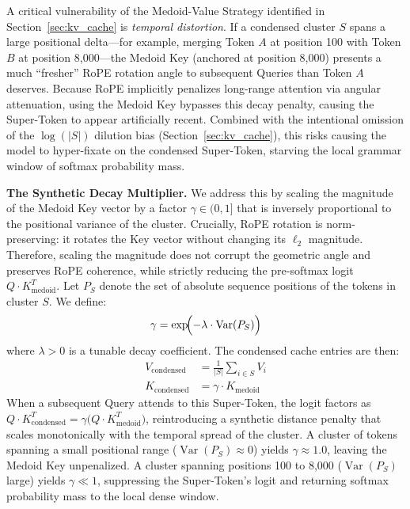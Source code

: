 \documentclass[11pt,a4paper]{article}
\begin{document}
A critical vulnerability of the Medoid-Value Strategy identified in Section~\ref{sec:kv_cache} is \emph{temporal distortion}. If a condensed cluster $S$ spans a large positional delta---for example, merging Token $A$ at position 100 with Token $B$ at position 8{,}000---the Medoid Key (anchored at position 8{,}000) presents a much ``fresher'' RoPE rotation angle to subsequent Queries than Token $A$ deserves. Because RoPE implicitly penalizes long-range attention via angular attenuation, using the Medoid Key bypasses this decay penalty, causing the Super-Token to appear artificially recent. Combined with the intentional omission of the $\log(|S|)$ dilution bias (Section~\ref{sec:kv_cache}), this risks causing the model to hyper-fixate on the condensed Super-Token, starving the local grammar window of softmax probability mass.

\textbf{The Synthetic Decay Multiplier.} We address this by scaling the magnitude of the Medoid Key vector by a factor $\gamma \in (0, 1]$ that is inversely proportional to the positional variance of the cluster. Crucially, RoPE rotation is norm-preserving: it rotates the Key vector without changing its $\ell_2$ magnitude. Therefore, scaling the magnitude does not corrupt the geometric angle and preserves RoPE coherence, while strictly reducing the pre-softmax logit $Q \cdot K_{\text{medoid}}^T$. Let $P_S$ denote the set of absolute sequence positions of the tokens in cluster $S$. We define:
\begin{equation}
\gamma = \exp\!\Bigl(-\lambda \cdot \operatorname{Var}(P_S)\Bigr)
\label{eq:gamma}
\end{equation}
where $\lambda > 0$ is a tunable decay coefficient. The condensed cache entries are then:
\begin{align}
V_{\text{condensed}} &= \frac{1}{|S|} \sum_{i \in S} V_i \label{eq:v_condensed} \\
K_{\text{condensed}} &= \gamma \cdot K_{\text{medoid}} \label{eq:k_condensed}
\end{align}
When a subsequent Query attends to this Super-Token, the logit factors as $Q \cdot K_{\text{condensed}}^T = \gamma \bigl(Q \cdot K_{\text{medoid}}^T\bigr)$, reintroducing a synthetic distance penalty that scales monotonically with the temporal spread of the cluster. A cluster of tokens spanning a small positional range ($\operatorname{Var}(P_S) \approx 0$) yields $\gamma \approx 1.0$, leaving the Medoid Key unpenalized. A cluster spanning positions 100 to 8{,}000 ($\operatorname{Var}(P_S)$ large) yields $\gamma \ll 1$, suppressing the Super-Token's logit and returning softmax probability mass to the local dense window.
\end{document}
